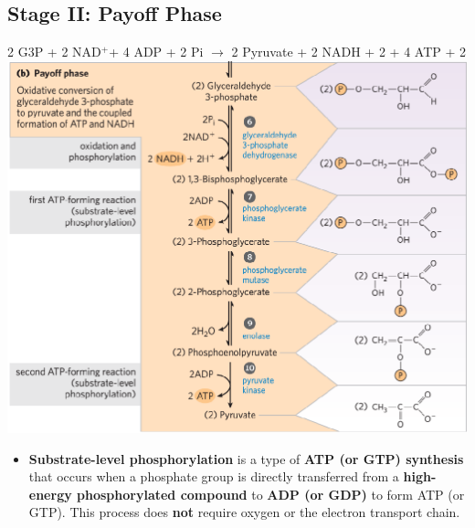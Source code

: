 \documentclass[10pt]{article}
\newcommand{\water}{\text{H$_2$O}}
\newcommand{\proton}{\text{H$^+$}}
\newcommand{\pc}{$^+$}
\begin{document}
\subsection*{Stage II: Payoff Phase}
\begin{center}
    2 G3P + 2 NAD\pc + 4 ADP + 2 Pi $\rightarrow$ 2 Pyruvate + 2 NADH + 2 \proton + 4 ATP + 2 \water\\
    \includegraphics*[width=\textwidth]{L3_3.png}
\end{center}
\begin{itemize}
	\item \textbf{Substrate-level phosphorylation} is a type of \textbf{ATP (or GTP) synthesis} that occurs when a phosphate group is directly transferred from a \textbf{high-energy phosphorylated compound} to \textbf{ADP (or GDP)} to form ATP (or GTP).  This process does \textbf{not} require oxygen or the electron transport chain.
\end{itemize}
\end{document}
